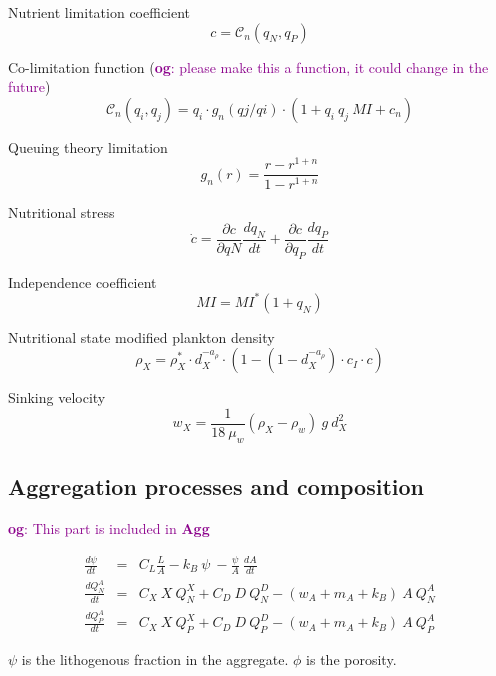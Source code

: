 \documentclass[fleqn]{article}                     %
\newcommand{\comment}[3][darkmagenta]{\textcolor{#1}{\textbf{#2}: #3}}
\begin{document}
Nutrient limitation coefficient
\begin{equation}
  c = \mathcal{C}_n(q_N,q_P)
\end{equation}

Co-limitation function (\comment{og}{please make this a function, it could change in the future})
\begin{equation}
  \mathcal{C}_n(q_i, q_j) = q_i \cdot g_n(qj/qi) \cdot (1 + q_i\ q_j\ MI + c_n)
\end{equation}

Queuing theory limitation
\begin{equation}
  g_n(r) = \frac{r - r^{1+n}}{1 - r^{1+n}}
\end{equation}

Nutritional stress
\begin{equation}
  \dot{c} = \frac{\partial c}{\partial qN}\frac{dq_N}{dt}+\frac{\partial c}{\partial q_P}\frac{dq_P}{dt}
\end{equation}

Independence coefficient
\begin{equation}
  MI = MI^*(1+q_N)
\end{equation}

Nutritional state modified plankton density
\begin{equation}
  \rho_X = \rho^*_X\cdot d_X^{-a_\rho}\cdot(1-(1-d_X^{-a_\rho})\cdot c_I\cdot  c)
\end{equation}

Sinking velocity
\begin{equation}
  w_X = \frac{1}{18\ \mu_w} (\rho_X-\rho_w)\ g\ d_X^2
\end{equation}

\subsection{Aggregation processes and composition}
\comment{og}{This part is included in \textbf{Agg}}

\begin{eqnarray}
  \frac{d\psi}{dt} &=& C_L \frac{L}{A} - k_B\ \psi\ -\frac{\psi}{A}\ \frac{dA}{dt} \\
  \frac{dQ^A_N}{dt} &=& C_X\ X\ Q^X_N +  C_D\ D\ Q^D_N -(w_A+m_A+k_B)\ A\ Q^A_N\\
  \frac{dQ^A_P}{dt} &=& C_X\ X\ Q^X_P +  C_D\ D\ Q^D_P -(w_A+m_A+k_B)\ A\ Q^A_P
\end{eqnarray}

$\psi$ is the lithogenous fraction in the aggregate.
$\phi$ is the porosity.
\end{document}
